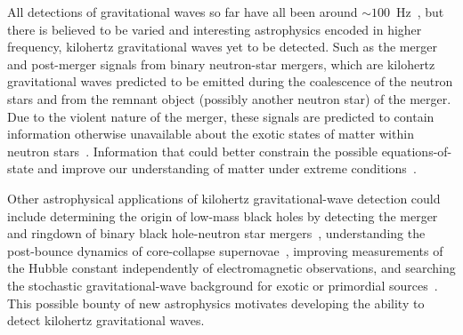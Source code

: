 All detections of gravitational waves so far have all been around $\sim100$~Hz~\cite{}, but there is believed to be varied and interesting astrophysics encoded in higher frequency, kilohertz gravitational waves yet to be detected.
Such as the merger and post-merger signals from binary neutron-star mergers, which are kilohertz gravitational waves predicted to be emitted during the coalescence of the neutron stars and from the remnant object (possibly another neutron star) of the merger. 
Due to the violent nature of the merger, these signals are predicted to contain information otherwise unavailable about the exotic states of matter within neutron stars~\cite{}. Information that could better constrain the possible equations-of-state and improve our understanding of matter under extreme conditions~\cite{miaoDesignGravitationalWaveDetectors2018,}. %

Other astrophysical applications of kilohertz gravitational-wave detection could include determining the origin of low-mass black holes by detecting the merger and ringdown of binary black hole-neutron star mergers~\cite{}, understanding the post-bounce dynamics of core-collapse supernovae~\cite{}, improving measurements of the Hubble constant independently of electromagnetic observations, and searching the stochastic gravitational-wave background for exotic or primordial sources~\cite{miaoDesignGravitationalWaveDetectors2018}.
This possible bounty of new astrophysics motivates developing the ability to detect kilohertz gravitational waves.



